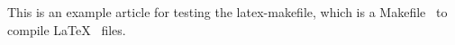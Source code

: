 This is an example article for testing the latex-makefile, which is a Makefile~\cite{stallman2002gnu} to compile \LaTeX~\cite{lamport1994latex} files.
